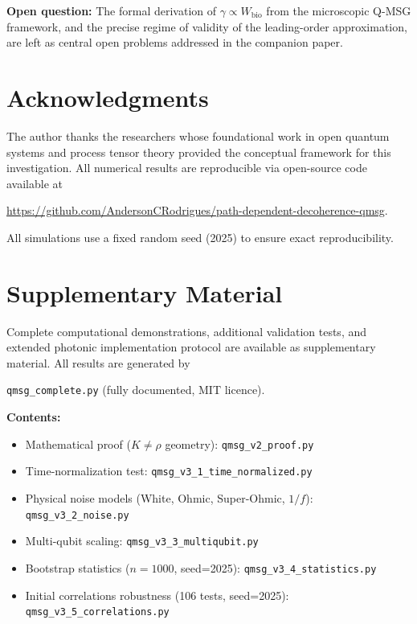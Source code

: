 \documentclass[12pt,a4paper]{article}
\begin{document}
\textbf{Open question:} The formal derivation of $\gamma \propto
W_{\mathrm{bio}}$ from the microscopic Q-MSG framework, and the precise
regime of validity of the leading-order approximation, are left as central
open problems addressed in the companion paper.

\section*{Acknowledgments}

The author thanks the researchers whose foundational work in open quantum systems
and process tensor theory provided the conceptual framework for this
investigation. All numerical results are reproducible via open-source
code available at
\begin{sloppypar}
\url{https://github.com/AndersonCRodrigues/path-dependent-decoherence-qmsg}.
\end{sloppypar}
All simulations use a fixed random seed (2025) to ensure exact
reproducibility.

\appendix

\section{Supplementary Material}

Complete computational demonstrations, additional validation tests, and
extended photonic implementation protocol are available as supplementary
material. All results are generated by
\begin{sloppypar}
\texttt{qmsg\_complete.py} (fully documented, MIT licence).
\end{sloppypar}

\textbf{Contents:}
\begin{itemize}
  \item Mathematical proof ($K \neq \rho$ geometry): \texttt{qmsg\_v2\_proof.py}
  \item Time-normalization test: \texttt{qmsg\_v3\_1\_time\_nor\-ma\-lized.py}
  \item Physical noise models (White, Ohmic, Super-Ohmic, $1/f$):
    \texttt{qmsg\_v3\_2\_noise.py}
  \item Multi-qubit scaling: \texttt{qmsg\_v3\_3\_multiqubit.py}
  \item Bootstrap statistics ($n=1000$, seed=2025):
    \texttt{qmsg\_v3\_4\_statistics.py}
  \item Initial correlations robustness (106 tests, seed=2025):
    \texttt{qmsg\_v3\_5\_correlations.py}
\end{itemize}



\end{document}
